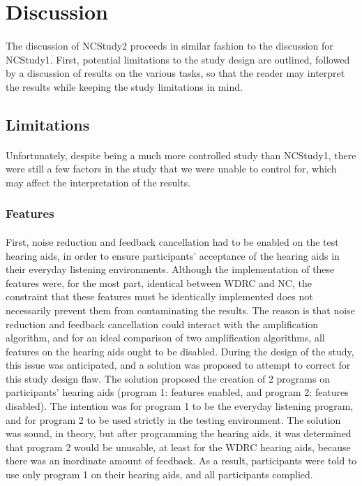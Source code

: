 \section{Discussion}
\paragraph{}The discussion of NCStudy2 proceeds in similar fashion to the discussion for NCStudy1.  First, potential limitations to the study design are outlined, followed by a discussion of results on the various tasks, so that the reader may interpret the results while keeping the study limitations in mind.

\subsection{Limitations}
\paragraph{}Unfortunately, despite being a much more controlled study than NCStudy1, there were still a few factors in the study that we were unable to control for, which may affect the interpretation of the results.

\subsubsection{Features}
\paragraph{}First, noise reduction and feedback cancellation had to be enabled on the test hearing aids, in order to ensure participants' acceptance of the hearing aids in their everyday listening environments.  Although the implementation of these features were, for the most part, identical between WDRC and NC, the constraint that these features must be identically implemented does not necessarily prevent them from contaminating the results.  The reason is that noise reduction and feedback cancellation could interact with the amplification algorithm, and for an ideal comparison of two amplification algorithms, all features on the hearing aids ought to be disabled.  During the design of the study, this issue was anticipated, and a solution was proposed to attempt to correct for this study design flaw.  The solution proposed the creation of 2 programs on participants' hearing aids (program 1: features enabled, and program 2: features disabled).  The intention was for program 1 to be the everyday listening program, and for program 2 to be used strictly in the testing environment.  The solution was sound, in theory, but after programming the hearing aids, it was determined that program 2 would be unusable, at least for the WDRC hearing aids, because there was an inordinate amount of feedback.  As a result, participants were told to use only program 1 on their hearing aids, and all participants complied.

